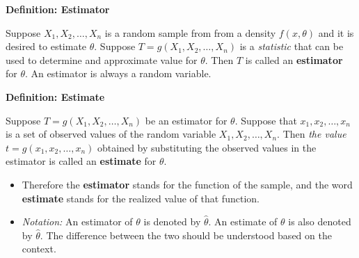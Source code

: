 \documentclass[]{book}
\begin{document}
\textbf{Definition: Estimator}

Suppose \(X_1, X_2, \dots, X_n\) is a random sample from from a density \(f(x, \theta)\) and it is desired to estimate \(\theta\). Suppose \(T=g(X_1, X_2, \dots, X_n)\) is a \emph{statistic} that can be used to determine and approximate value for \(\theta\). Then \(T\) is called an \textbf{estimator} for \(\theta\). An estimator is always a random variable.

\textbf{Definition: Estimate}

Suppose \(T=g(X_1, X_2, \dots, X_n)\) be an estimator for \(\theta\). Suppose that \(x_1, x_2, \dots, x_n\) is a set of observed values of the random variable \(X_1, X_2, \dots, X_n.\) Then \emph{the value} \(t=g(x_1, x_2, \dots, x_n)\) obtained by substituting the observed values in the estimator is called an \textbf{estimate} for \(\theta\).

\begin{itemize}
\item
  Therefore the \textbf{estimator} stands for the function of the sample, and the word \textbf{estimate} stands for the realized value of that function.
\item
  \emph{Notation:} An estimator of \(\theta\) is denoted by \(\hat{\theta}\). An estimate of \(\theta\) is also denoted by \(\hat{\theta}\). The difference between the two should be understood based on the context.
\end{itemize}
\end{document}

